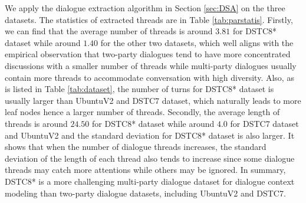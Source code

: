 We apply the dialogue extraction algorithm in Section \ref{sec:DSA} on the three datasets. The statistics of extracted threads are in Table \ref{tab:parstatis}.
Firstly, we can find that the average number of threads is around $3.81$ for DSTC8* dataset while around $1.40$ for the other two datasets, which well aligns with the empirical observation that two-party dialogues tend to have more concentrated discussions with a smaller number of threads while multi-party dialogues usually contain more threads to accommodate conversation with high diversity. Also, as is listed in Table \ref{tab:dataset}, the number of turns for DSTC8* dataset is usually larger than UbuntuV2 and DSTC7 dataset, which naturally leads to more leaf nodes hence a larger number of threads. 
Secondly, the average length of threads is around $24.50$ for DSTC8* dataset while around $4.0$ for DSTC7 dataset and UbuntuV2 and the standard deviation for DSTC8* dataset is also larger. It shows that when the number of dialogue threads increases, the standard deviation of the length of each thread also tends to increase since some dialogue threads may catch more attentions while others may be ignored. 
In summary, DSTC8* is a more challenging multi-party dialogue dataset for dialogue context modeling than two-party dialogue datasets, including UbuntuV2 and DSTC7.


